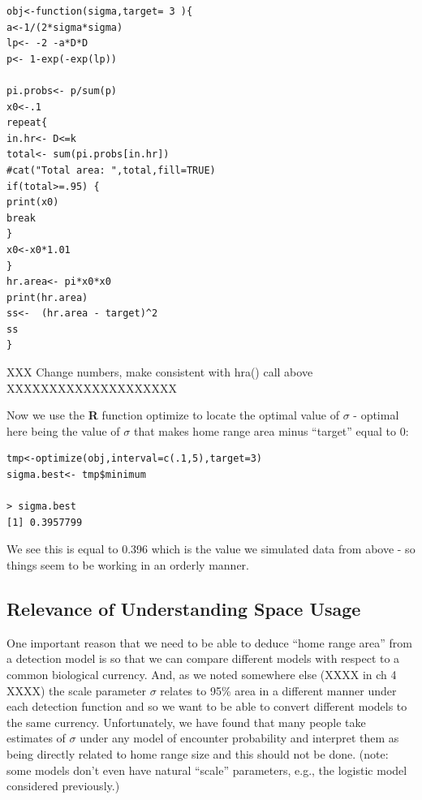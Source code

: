 \begin{verbatim}
obj<-function(sigma,target= 3 ){
a<-1/(2*sigma*sigma)
lp<- -2 -a*D*D
p<- 1-exp(-exp(lp))

pi.probs<- p/sum(p)
x0<-.1
repeat{
in.hr<- D<=k
total<- sum(pi.probs[in.hr])  
#cat("Total area: ",total,fill=TRUE)
if(total>=.95) {
print(x0)
break
}
x0<-x0*1.01
}
hr.area<- pi*x0*x0
print(hr.area)
ss<-  (hr.area - target)^2
ss
}
\end{verbatim}



XXX Change numbers, make consistent with hra() call above
XXXXXXXXXXXXXXXXXXXX 


Now we use the {\bf R} function optimize to locate the optimal value
of $\sigma$ - optimal here being the value of $\sigma$  that makes
home range area minus ``target''  equal to 0:
\begin{verbatim}
tmp<-optimize(obj,interval=c(.1,5),target=3)
sigma.best<- tmp$minimum

> sigma.best
[1] 0.3957799
\end{verbatim}

We see this is equal to 0.396 which is the value we simulated data from above - so things seem to be working in an orderly manner. 


\subsection{Relevance of Understanding Space Usage}

One important reason that we need to be able to deduce ``home range
area'' from a detection model is so that we can compare different
models with respect to a common biological currency. And, 
as we noted somewhere else (XXXX in ch 4 XXXX) the scale parameter $\sigma$
relates to 95\% area in a different manner under each detection
function and so we want to be able to convert different models to the
same currency. Unfortunately, we have found that many people take
estimates of $\sigma$ under any model of encounter probability and
interpret them as being directly related to home range size and this
should not be done. (note:
some models don't even have natural ``scale'' parameters, e.g., the
logistic model considered previously.)


